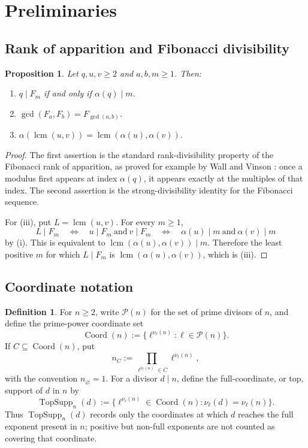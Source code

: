 \documentclass[11pt,letterpaper]{article}
\numberwithin{equation}{section}
\theoremstyle{plain}
\newtheorem{proposition}[theorem]{Proposition}
\theoremstyle{definition}
\newtheorem{definition}[theorem]{Definition}
\theoremstyle{remark}
\DeclareMathOperator{\lcmop}{lcm}
\DeclareMathOperator{\Coord}{Coord}
\DeclareMathOperator{\TopSupp}{TopSupp}
\begin{document}
\section{Preliminaries}\label{sec:prelim}

\subsection{Rank of apparition and Fibonacci divisibility}\label{subsec:fib-div}

\begin{proposition}\label{prop:rank-basics}
Let \(q,u,v\ge2\) and \(a,b,m\ge1\). Then:
\begin{enumerate}[label=\textup{(\roman*)}]
\item \(q\mid F_m\) if and only if \(\alpha(q)\mid m\).
\item \(\gcd(F_a,F_b)=F_{\gcd(a,b)}\).
\item \(\alpha(\lcmop(u,v))=\lcmop(\alpha(u),\alpha(v))\).
\end{enumerate}
\end{proposition}

\begin{proof}
The first assertion is the standard rank-divisibility property of the
Fibonacci rank of apparition, as proved for example by Wall
\cite{Wall1960FibonacciModm} and Vinson \cite{Vinson1963RankApparition}: once
a modulus first appears at index \(\alpha(q)\), it appears exactly at the
multiples of that index. The second assertion is the strong-divisibility
identity for the Fibonacci sequence.

For (iii), put \(L=\lcmop(u,v)\). For every \(m\ge1\),
\[
L\mid F_m
\quad\Longleftrightarrow\quad
u\mid F_m\ \text{and}\ v\mid F_m
\quad\Longleftrightarrow\quad
\alpha(u)\mid m\ \text{and}\ \alpha(v)\mid m
\]
by (i). This is equivalent to
\(\lcmop(\alpha(u),\alpha(v))\mid m\). Therefore the least positive \(m\)
for which \(L\mid F_m\) is \(\lcmop(\alpha(u),\alpha(v))\), which is (iii).
\end{proof}

\subsection{Coordinate notation}\label{subsec:coordinates}

\begin{definition}\label{def:coordinate-notation}
For \(n\ge2\), write \(\mathcal P(n)\) for the set of prime divisors of
\(n\), and define the prime-power coordinate set
\[
\Coord(n):=\{\ell^{\nu_\ell(n)}:\ell\in\mathcal P(n)\}.
\]
If \(C\subseteq\Coord(n)\), put
\[
n_C:=\prod_{\ell^{\nu_\ell(n)}\in C}\ell^{\nu_\ell(n)},
\]
with the convention \(n_\varnothing=1\). For a divisor \(d\mid n\), define
the full-coordinate, or top, support of \(d\) in \(n\) by
\[
\TopSupp_n(d):=
\{\ell^{\nu_\ell(n)}\in\Coord(n):\nu_\ell(d)=\nu_\ell(n)\}.
\]
Thus \(\TopSupp_n(d)\) records only the coordinates at which \(d\) reaches the
full exponent present in \(n\); positive but non-full exponents are not counted
as covering that coordinate.
\end{definition}
\end{document}
